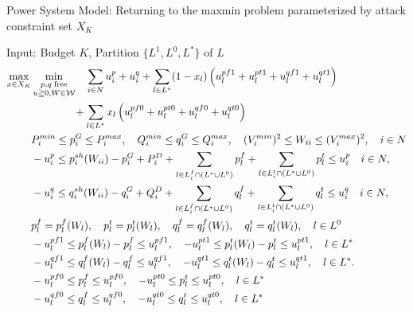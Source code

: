 \documentclass[xcolor=dvipsnames]{beamer}
\newcommand{\p}[1]{p^{#1}}
\newcommand{\q}[1]{q^{#1}}
\newcommand{\ii}{i}
\newcommand{\llll}{l}
\newcommand{\from}{f}
\newcommand{\tto}{t}
\newcommand{\WW}{W}
\newcommand{\WSet}{\mathcal{W}}
\newcommand{\Lines}{L}
\begin{document}
\begin{frame}{Power System Model: Returning to the maxmin problem parameterized by attack constraint set $X_K$}
\begin{footnotesize}
Input: Budget $K$, Partition $\{ L^1,L^0,L^* \}$ of $L$
\begin{subequations}
\begin{align}
\max_{x \in X_K} &\min_{\substack{p,q\;\text{free}\\ u \geqq 0,W\in \WSet}} \quad 
 \sum_{i \in N} u_i^p + u_i^q + \sum_{l \in L^*} (1-x_l)\left( u_l^{pf1} + u_l^{pt1} + u_l^{qf1} + u_l^{qt1} \right) \notag \\
&\qquad\qquad+ \sum_{l \in L^*} x_l\left( u_l^{pf0} + u_l^{pt0} + u_l^{qf0} + u_l^{qt0} \right)  \notag \\
  & P_i^{min} \leq p_i^G \leq P_i^{max}, \quad Q_i^{min} \leq q_i^G \leq Q_i^{max}, \quad (V_i^{min})^2 \leq W_{ii} \leq (V_i^{max})^2,\quad i\in N \notag \\
  & -u_i^p \le p_i^{sh}(\WW_{ii}) - p^G_i + P^D_i 
	+ \sum_{\llll \in \Lines_\ii^{\from} \cap (L^* \cup L^0)  } p_{l}^{f}  
	+\sum_{\llll \in \Lines_\ii^{\tto} \cap (L^* \cup L^0) } p_{l}^{t} 
	\le u_i^p \quad i\in N, \notag\\ 
  & -u_i^q \le q_i^{sh}(\WW_{ii}) - q^G_i + Q^D_i 
	+ \sum_{\llll \in \Lines_\ii^{\from} \cap (L^* \cup L^0) } q_{l}^{f}
	+ \sum_{\llll \in \Lines_\ii^{\tto} \cap (L^* \cup L^0) } q_{l}^{t} 
	\le u_i^q \quad i\in N, \notag \\
& p_{l}^{f}=\p{\from}_{\llll}(\WW_\llll),\quad p_l^t=\p{\tto}_{\llll}(\WW_\llll),\quad q_l^f=\q{\from}_{\llll}(\WW_\llll),\quad q_l^t=\q{\tto}_{\llll}(\WW_\llll) , \quad \llll \in L^0 \notag \\
& -u_l^{pf1} \le \p{\from}_{\llll}(\WW_\llll) - p_{l}^{f} \le u_l^{pf1}, \quad
 -u_l^{pt1} \le \p{\tto}_{\llll}(\WW_\llll)  - p_{l}^{t} \le u_l^{pt1}, \quad \llll \in L^* \notag \\
& -u_l^{qf1} \le \q{\from}_{\llll}(\WW_\llll) - q_{l}^{f} \le u_l^{qf1}, \quad 
 -u_l^{qt1} \le \q{\tto}_{\llll}(\WW_\llll)  - q_{l}^{t} \le u_l^{qt1}, \quad \llll \in L^*. \notag \\
& -u_l^{pf0} \le p_l^f \le u_l^{pf0},\quad-u_l^{pt0} \le p_l^t \le u_l^{pt0}, \quad l \in L^* \notag\\ 
& -u_l^{qf0} \le q_l^f \le u_l^{qf0},\quad-u_l^{qt0} \le q_l^t \le u_l^{qt0}, \quad l \in L^* \notag
\end{align}
\end{subequations}
\end{footnotesize}
\end{frame}
\end{document}
